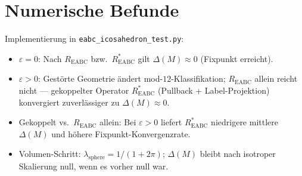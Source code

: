 \documentclass[11pt,a4paper]{article}
\begin{document}
\section{Numerische Befunde}

Implementierung in \texttt{eabc\_icosahedron\_test.py}:

\begin{itemize}
\item $\varepsilon=0$: Nach $R_{\mathrm{EABC}}$ bzw.\ $R^*_{\mathrm{EABC}}$
  gilt $\Delta(M)\approx 0$ (Fixpunkt erreicht).
\item $\varepsilon>0$: Gestörte Geometrie ändert mod-$12$-Klassifikation;
  $R_{\mathrm{EABC}}$ allein reicht nicht --- gekoppelter Operator $R^*_{\mathrm{EABC}}$
  (Pullback + Label-Projektion) konvergiert zuverlässiger zu $\Delta(M)\approx 0$.
\item Gekoppelt vs.\ $R_{\mathrm{EABC}}$ allein: Bei $\varepsilon>0$ liefert
  $R^*_{\mathrm{EABC}}$ niedrigere mittlere $\Delta(M)$ und höhere Fixpunkt-Konvergenzrate.
\item Volumen-Schritt: $\lambda_{\mathrm{sphere}}=1/(1+2\pi)$; $\Delta(M)$ bleibt
  nach isotroper Skalierung null, wenn es vorher null war.
\end{itemize}
\end{document}
